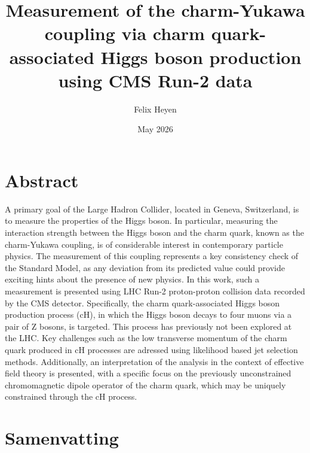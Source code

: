\documentclass[a4paper]{book}
\title{Measurement of the charm-Yukawa coupling via charm quark-associated Higgs boson production using CMS Run-2 data}
\author{Felix Heyen}
\date{May 2026}
\begin{document}
\frontmatter
\maketitle%

\chapter{Abstract}

A primary goal of the Large Hadron Collider, located in Geneva, Switzerland, is to measure the properties of the Higgs boson. In particular, measuring the
interaction strength between the Higgs boson and the charm quark, known as the charm-Yukawa coupling, is of considerable interest in contemporary particle physics. The measurement of this coupling represents a key consistency check of the Standard Model, as any deviation from its predicted value
could provide exciting hints about the presence of new physics. In this work, such a measurement is presented using LHC Run-2 proton-proton collision data recorded by the CMS detector. Specifically, the charm quark-associated Higgs boson production process (cH), in which the Higgs boson decays to four muons via a pair of Z bosons, is targeted. This process has previously not been explored at the LHC. Key challenges such as the low transverse momentum of the charm quark produced in cH processes are adressed using likelihood based jet selection methods. Additionally, an interpretation of the analysis in the context of effective field theory is presented, with a specific focus on the previously unconstrained chromomagnetic dipole operator of the charm quark, which may be uniquely constrained through the cH process.
\chapter{Samenvatting}
\end{document}
